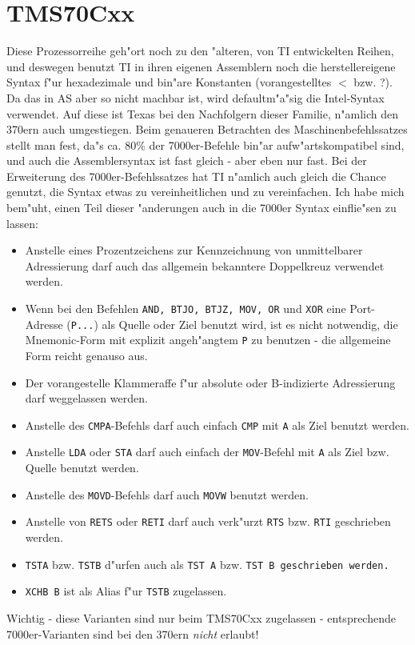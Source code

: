 \documentclass[12pt,a4paper,twoside]{report}
\newcommand{\tty}[1]{{\tt #1}}
\begin{document}
{%

\section{TMS70Cxx}

Diese Prozessorreihe geh"ort noch zu den "alteren, von TI entwickelten
Reihen, und deswegen benutzt TI in ihren eigenen Assemblern noch die
herstellereigene Syntax f"ur hexadezimale und bin"are Konstanten
(vorangestelltes $<$ bzw. ?).  Da das in AS aber so nicht machbar ist, wird
defaultm"a"sig die Intel-Syntax verwendet.  Auf diese ist Texas bei den
Nachfolgern dieser Familie, n"amlich den 370ern auch umgestiegen.  Beim
genaueren Betrachten des Maschinenbefehlssatzes stellt man fest, da"s
ca. 80\% der 7000er-Befehle bin"ar aufw"artskompatibel sind, und auch die 
Assemblersyntax ist fast gleich - aber eben nur fast.  Bei der Erweiterung
des 7000er-Befehlssatzes hat TI n"amlich auch gleich die Chance genutzt,
die Syntax etwas zu vereinheitlichen und zu vereinfachen.  Ich habe mich
bem"uht, einen Teil dieser "anderungen auch in die 7000er Syntax
einflie"sen zu lassen:
\begin{itemize}
\item{Anstelle eines Prozentzeichens zur Kennzeichnung von
      unmittelbarer Adressierung darf auch das allgemein bekanntere Doppelkreuz
      verwendet werden.}
\item{Wenn bei den Befehlen \tty{AND, BTJO, BTJZ, MOV, OR} und
      \tty{XOR} eine Port-Adresse (\tty{P...}) als Quelle oder Ziel
      benutzt wird, ist es nicht notwendig, die Mnemonic-Form mit explizit
      angeh"angtem \tty{P} zu benutzen - die allgemeine Form reicht genauso
      aus.}
\item{Der vorangestelle Klammeraffe f"ur absolute oder B-indizierte 
      Adressierung darf weggelassen werden.}
\item{Anstelle des \tty{CMPA}-Befehls darf auch einfach
      \tty{CMP} mit \tty{A} als Ziel benutzt werden.}
\item{Anstelle \tty{LDA} oder \tty{STA} darf auch einfach der \tty{MOV}-Befehl
      mit \tty{A} als Ziel bzw. Quelle benutzt werden.}
\item{Anstelle des \tty{MOVD}-Befehls darf auch \tty{MOVW} benutzt werden.}
\item{Anstelle von \tty{RETS} oder \tty{RETI} darf auch verk"urzt
      \tty{RTS} bzw. \tty{RTI} geschrieben werden.}
\item{\tty{TSTA} bzw. \tty{TSTB} d"urfen auch als \tty{TST A} bzw. \tt{TST
      B} geschrieben werden.}
\item{\tty{XCHB B} ist als Alias f"ur \tty{TSTB} zugelassen.}
\end{itemize}
Wichtig - diese Varianten sind nur beim TMS70Cxx zugelassen - entsprechende
7000er-Varianten sind bei den 370ern {\em nicht} erlaubt!

}
\end{document}
